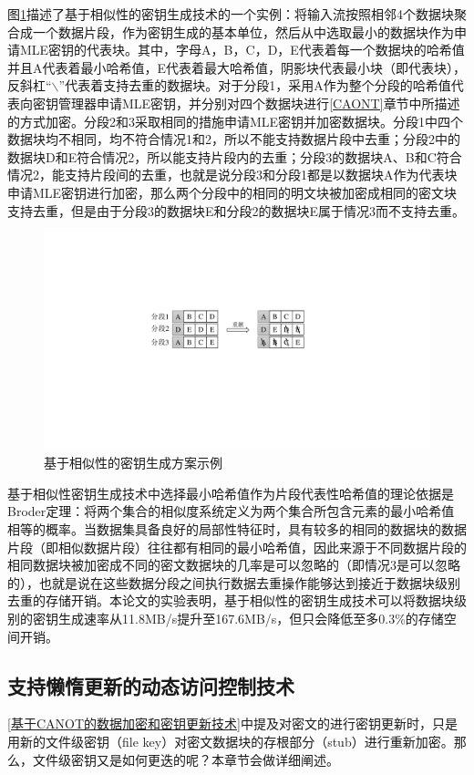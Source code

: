 \documentclass[promaster]{thesis-uestc}
\begin{document}
图\ref{基于相似性的密钥生成方案示例}描述了基于相似性的密钥生成技术的一个实例：将输入流按照相邻4个数据块聚合成一个数据片段，作为密钥生成的基本单位，然后从中选取最小的数据块作为申请MLE密钥的代表块。其中，字母A，B，C，D，E代表着每一个数据块的哈希值并且A代表着最小哈希值，E代表着最大哈希值，阴影块代表最小块（即代表块），反斜杠“$\backslash$”代表着支持去重的数据块。对于分段1，采用A作为整个分段的哈希值代表向密钥管理器申请MLE密钥，并分别对四个数据块进行\ref{CAONT}章节中所描述的方式加密。分段2和3采取相同的措施申请MLE密钥并加密数据块。分段1中四个数据块均不相同，均不符合情况1和2，所以不能支持数据片段中去重；分段2中的数据块D和E符合情况2，所以能支持片段内的去重；分段3的数据块A、B和C符合情况2，能支持片段间的去重，也就是说分段3和分段1都是以数据块A作为代表块申请MLE密钥进行加密，那么两个分段中的相同的明文块被加密成相同的密文块支持去重，但是由于分段3的数据块E和分段2的数据块E属于情况3而不支持去重。
\begin{figure}[htbp]
    \centering
    \includegraphics[width = 0.6\linewidth]{pic/相似性密钥生成方案.pdf}
    \caption{基于相似性的密钥生成方案示例}
    \label{基于相似性的密钥生成方案示例}
\end{figure}

基于相似性密钥生成技术中选择最小哈希值作为片段代表性哈希值的理论依据是Broder定理：将两个集合的相似度系统定义为两个集合所包含元素的最小哈希值相等的概率。当数据集具备良好的局部性特征时，具有较多的相同的数据块的数据片段（即相似数据片段）往往都有相同的最小哈希值，因此来源于不同数据片段的相同数据块被加密成不同的密文数据块的几率是可以忽略的（即情况3是可以忽略的），也就是说在这些数据分段之间执行数据去重操作能够达到接近于数据块级别去重的存储开销。本论文的实验表明，基于相似性的密钥生成技术可以将数据块级别的密钥生成速率从11.8MB/s提升至167.6MB/s，但只会降低至多0.3\%的存储空间开销。

\subsection{支持懒惰更新的动态访问控制技术}\label{支持懒惰更新的动态访问控制技术}
\ref{基于CANOT的数据加密和密钥更新技术}中提及对密文的进行密钥更新时，只是用新的文件级密钥（file key）对密文数据块的存根部分（stub）进行重新加密。那么，文件级密钥又是如何更迭的呢？本章节会做详细阐述。
\end{document}
